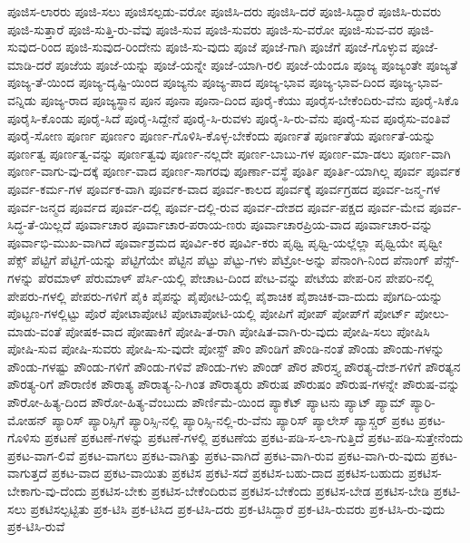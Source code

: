 {ಪೂಜಿಸ-ಲಾರರು
ಪೂಜಿ-ಸಲು
ಪೂಜಿಸಲ್ಪಡು-ವರೋ
ಪೂಜಿಸಿ-ದರು
ಪೂಜಿಸಿ-ದರೆ
ಪೂಜಿ-ಸಿದ್ದಾರೆ
ಪೂಜಿಸಿ-ರುವರು
ಪೂಜಿ-ಸುತ್ತಾರೆ
ಪೂಜಿ-ಸುತ್ತಿ-ರು-ವೆವು
ಪೂಜಿ-ಸುವ
ಪೂಜಿ-ಸುವರು
ಪೂಜಿ-ಸು-ವರೋ
ಪೂಜಿ-ಸುವ-ವರ
ಪೂಜಿ-ಸುವುದ-ರಿಂದ
ಪೂಜಿ-ಸುವುದ-ರಿಂದೇನು
ಪೂಜಿ-ಸು-ವುದು
ಪೂಜೆ
ಪೂಜೆ-ಗಾಗಿ
ಪೂಜೆಗೆ
ಪೂಜೆ-ಗೊಳ್ಳುವ
ಪೂಜೆ-ಮಾಡಿ-ದರೆ
ಪೂಜೆಯ
ಪೂಜೆ-ಯನ್ನು
ಪೂಜೆ-ಯನ್ನೇ
ಪೂಜೆ-ಯಾಗಿ-ರಲಿ
ಪೂಜೆ-ಯೆಂದೂ
ಪೂಜ್ಯ
ಪೂಜ್ಯಂತೇ
ಪೂಜ್ಯತೆ
ಪೂಜ್ಯ-ತೆ-ಯಿಂದ
ಪೂಜ್ಯ-ದೃಷ್ಟಿ-ಯಿಂದ
ಪೂಜ್ಯನು
ಪೂಜ್ಯ-ಪಾದ
ಪೂಜ್ಯ-ಭಾವ
ಪೂಜ್ಯ-ಭಾವ-ದಿಂದ
ಪೂಜ್ಯ-ಭಾವ-ವನ್ನಿಡು
ಪೂಜ್ಯ-ರಾದ
ಪೂಜ್ಯಸ್ಥಾನ
ಪೂನ
ಪೂನಾ
ಪೂನಾ-ದಿಂದ
ಪೂರೈ-ಕೆಯು
ಪೂರೈಸ-ಬೇಕೆಂದಿರು-ವೆನು
ಪೂರೈ-ಸಿಕೊ
ಪೂರೈಸಿ-ಕೊಂಡು
ಪೂರೈ-ಸಿದೆ
ಪೂರೈ-ಸಿದ್ದೇನೆ
ಪೂರೈ-ಸಿ-ರುವಳು
ಪೂರೈ-ಸಿ-ರು-ವೆನು
ಪೂರೈ-ಸುವ
ಪೂರೈಸು-ವಂತಿವೆ
ಪೂರೈ-ಸೋಣ
ಪೂರ್ಣ
ಪೂರ್ಣಂ
ಪೂರ್ಣ-ಗೊಳಿಸಿ-ಕೊಳ್ಳ-ಬೇಕೆಂದು
ಪೂರ್ಣತೆ
ಪೂರ್ಣತೆಯ
ಪೂರ್ಣತೆ-ಯನ್ನು
ಪೂರ್ಣತ್ವ
ಪೂರ್ಣತ್ವ-ವನ್ನು
ಪೂರ್ಣತ್ವವು
ಪೂರ್ಣ-ನಲ್ಲದೇ
ಪೂರ್ಣ-ಬಾಬು-ಗಳ
ಪೂರ್ಣ-ಮಾ-ಡಲು
ಪೂರ್ಣ-ವಾಗಿ
ಪೂರ್ಣ-ವಾಗು-ವು-ದಕ್ಕೆ
ಪೂರ್ಣ-ವಾದ
ಪೂರ್ಣ-ಸಾಗರವು
ಪೂರ್ಣಾ-ವಸ್ಥೆ
ಪೂರ್ತಿ
ಪೂರ್ತಿ-ಯಾಗಿಲ್ಲ
ಪೂರ್ವ
ಪೂರ್ವಕ
ಪೂರ್ವ-ಕರ್ಮ-ಗಳ
ಪೂರ್ವಕ-ವಾಗಿ
ಪೂರ್ವಕ-ವಾದ
ಪೂರ್ವ-ಕಾಲದ
ಪೂರ್ವಕ್ಕೆ
ಪೂರ್ವಗ್ರಹದ
ಪೂರ್ವ-ಜನ್ಮ-ಗಳ
ಪೂರ್ವ-ಜನ್ಮದ
ಪೂರ್ವದ
ಪೂರ್ವ-ದಲ್ಲಿ
ಪೂರ್ವ-ದಲ್ಲಿ-ರುವ
ಪೂರ್ವ-ದೇಶದ
ಪೂರ್ವ-ಪಕ್ಷದ
ಪೂರ್ವ-ಮೇವ
ಪೂರ್ವ-ಸಿದ್ಧ-ತೆ-ಯಿಲ್ಲದೆ
ಪೂರ್ವಾಚಾರ
ಪೂರ್ವಾಚಾರ-ಪರಾಯ-ಣರು
ಪೂರ್ವಾಚಾರಪ್ರಿಯ-ವಾದ
ಪೂರ್ವಾಚಾರ-ವನ್ನು
ಪೂರ್ವಾಭಿ-ಮುಖ-ವಾಗಿದೆ
ಪೂರ್ವಾಶ್ರಮದ
ಪೂರ್ವಿ-ಕರ
ಪೂರ್ವಿ-ಕರು
ಪೃಥ್ವಿ
ಪೃಥ್ವಿ-ಯಲ್ಲೆಲ್ಲಾ
ಪೃಥ್ವಿಯೇ
ಪೃಥ್ವೀ
ಪೆಕ್ಸ್
ಪೆಟ್ಟಿಗೆ
ಪೆಟ್ಟಿಗೆ-ಯನ್ನು
ಪೆಟ್ಟಿಗೆಯೇ
ಪೆಟ್ಟಿನ
ಪೆಟ್ಟು
ಪೆಟ್ಟು-ಗಳು
ಪೆಟ್ರೋ-ಅನ್ನು
ಪೆನಾಂಗಿ-ನಿಂದ
ಪೆನಾಂಗ್
ಪೆನ್ಸ್‌-ಗಳನ್ನು
ಪೆರಮಾಳ್
ಪೆರುಮಾಳ್
ಪೆರ್ಸಿ-ಯಲ್ಲಿ
ಪೇಚಾಟ-ದಿಂದ
ಪೇಟ-ವನ್ನು
ಪೇಟೆಯ
ಪೇಪ-ರಿನ
ಪೇಪರಿ-ನಲ್ಲಿ
ಪೇಪರು-ಗಳಲ್ಲಿ
ಪೇಪರು-ಗಳಿಗೆ
ಪೈಕಿ
ಪೈಪನ್ನು
ಪೈಪೋಟಿ-ಯಲ್ಲಿ
ಪೈಶಾಚಿಕ
ಪೈಶಾಚಿಕ-ವಾ-ದುದು
ಪೊಗದಿ-ಯನ್ನು
ಪೊಟ್ಟಣ-ಗಳಲ್ಲಿಟ್ಟು
ಪೊರೆ
ಪೋಟಾಪೋಟಿ
ಪೋಟಾಪೋಟಿ-ಯಲ್ಲಿ
ಪೋಪಿಗೆ
ಪೋಪ್
ಪೋಪ್‌ಗೆ
ಪೋರ್ಟ್
ಪೋಲು-ಮಾಡು-ವಂತೆ
ಪೋಷಕ-ವಾದ
ಪೋಷಾಕಿಗೆ
ಪೋಷಿ-ತ-ರಾಗಿ
ಪೋಷಿತ-ವಾಗಿ-ರು-ವುದು
ಪೋಷಿ-ಸಲು
ಪೋಷಿಸಿ
ಪೋಷಿ-ಸುವ
ಪೋಷಿ-ಸುವರು
ಪೋಷಿ-ಸು-ವುದೇ
ಪೋಸ್ಟ್
ಪೌಂ
ಪೌಂಡಿಗೆ
ಪೌಂಡಿ-ನಂತೆ
ಪೌಂಡು
ಪೌಂಡು-ಗಳನ್ನು
ಪೌಂಡು-ಗಳಷ್ಟು
ಪೌಂಡು-ಗಳಿಗೆ
ಪೌಂಡು-ಗಳಿವೆ
ಪೌಂಡು-ಗಳು
ಪೌಂಡ್
ಪೌರ
ಪೌರಸ್ತ್ಯ
ಪೌರತ್ಯ-ದೇಶ-ಗಳಿಗೆ
ಪೌರತ್ಯನ
ಪೌರತ್ಯ-ರಿಗೆ
ಪೌರಾಣಿಕ
ಪೌರಾತ್ಯ
ಪೌರಾತ್ಯ-ನಿ-ಗಿಂತ
ಪೌರಾತ್ಯರು
ಪೌರುಷ
ಪೌರುಷಂ
ಪೌರುಷ-ಗಳನ್ನೇ
ಪೌರುಷ-ವನ್ನು
ಪೌರೋ-ಹಿತ್ಯ-ದಿಂದ
ಪೌರೋ-ಹಿತ್ಯ-ವೆಂಬುದು
ಪೌರ್ಣಿಮೆ-ಯಿಂದ
ಪ್ಯಾಕೆಟ್
ಪ್ಯಾಟನು
ಪ್ಯಾಟ್
ಪ್ಯಾಮ್
ಪ್ಯಾರಿ-ಮೋಹನ್
ಪ್ಯಾರಿಸ್
ಪ್ಯಾರಿಸ್ಸಿಗೆ
ಪ್ಯಾರಿಸ್ಸಿ-ನಲ್ಲಿ
ಪ್ಯಾರಿಸ್ಸಿ-ನಲ್ಲಿ-ರು-ವೆನು
ಪ್ಯಾರಿಸ್‌
ಪ್ಯಾಲೇಸ್
ಪ್ಯಾಸ್ಚರ್
ಪ್ರಕಟ
ಪ್ರಕಟ-ಗೊಳಿಸು
ಪ್ರಕಟಣೆ
ಪ್ರಕಟಣೆ-ಗಳನ್ನು
ಪ್ರಕಟಣೆ-ಗಳಲ್ಲಿ
ಪ್ರಕಟಣೆಯ
ಪ್ರಕಟ-ಪಡಿ-ಸ-ಲಾ-ಗುತ್ತಿದೆ
ಪ್ರಕಟ-ಪಡಿ-ಸುತ್ತೇನೆಂದು
ಪ್ರಕಟ-ವಾಗ-ಲಿವೆ
ಪ್ರಕಟ-ವಾಗಲು
ಪ್ರಕಟ-ವಾಗಿತ್ತು
ಪ್ರಕಟ-ವಾಗಿದೆ
ಪ್ರಕಟ-ವಾಗಿ-ರುವ
ಪ್ರಕಟ-ವಾಗಿ-ರು-ವುದು
ಪ್ರಕಟ-ವಾಗುತ್ತದೆ
ಪ್ರಕಟ-ವಾದ
ಪ್ರಕಟ-ವಾಯಿತು
ಪ್ರಕಟಿಸ
ಪ್ರಕಟಿ-ಸದೆ
ಪ್ರಕಟಿಸ-ಬಹು-ದಾದ
ಪ್ರಕಟಿಸ-ಬಹುದು
ಪ್ರಕಟಿಸ-ಬೇಕಾಗು-ವು-ದೆಂದು
ಪ್ರಕಟಿಸ-ಬೇಕು
ಪ್ರಕಟಿಸ-ಬೇಕೆಂದಿರುವ
ಪ್ರಕಟಿಸ-ಬೇಕೆಂದು
ಪ್ರಕಟಿಸ-ಬೇಡ
ಪ್ರಕಟಿಸ-ಬೇಡಿ
ಪ್ರಕಟಿ-ಸಲು
ಪ್ರಕಟಿಸಲ್ಪಟ್ಟಿತು
ಪ್ರಕ-ಟಿಸಿ
ಪ್ರಕ-ಟಿಸಿದ
ಪ್ರಕ-ಟಿಸಿ-ದರು
ಪ್ರಕ-ಟಿಸಿದ್ದಾರೆ
ಪ್ರಕ-ಟಿಸಿ-ರುವರು
ಪ್ರಕ-ಟಿಸಿ-ರು-ವುದು
ಪ್ರಕ-ಟಿಸಿ-ರುವೆ
}
